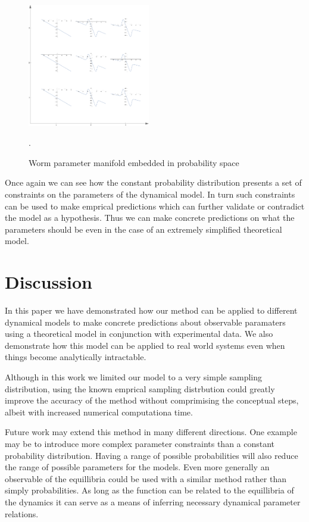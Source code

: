 \documentclass[letterpaper]{article}
\begin{document}
\begin{figure}[t]
\begin{center}
\includegraphics[width=2.1in,angle=0]{./worm_params.png}
\caption{Worm parameter manifold embedded in probability space}.
\label{worm_prob}
\end{center}
\end{figure}

Once again we can see how the constant probability distribution presents a set of 
constraints on the parameters of the dynamical model. In turn such constraints can
be used to make emprical predictions which can further validate or contradict the
model as a hypothesis. Thus we can make concrete predictions on what the parameters
should be even in the case of an extremely simplified theoretical model.

\section{Discussion}
In this paper we have demonstrated how our method can be applied to different
dynamical models to make concrete predictions about observable paramaters using 
a theoretical model in conjunction with experimental data. We also demonstrate
how this model can be applied to real world systems even when things become 
analytically intractable.

Although in this work we limited our model to a very simple sampling distribution,
using the known emprical sampling distrbution could greatly improve the accuracy of
the method without comprimising the conceptual steps, albeit with increased numerical
computationa time.

Future work may extend this method in many different directions. One example may 
be to introduce more complex parameter constraints than a constant probability
distribution. Having a range of possible probabilities will also reduce the
range of possible parameters for the models. Even more generally an observable
of the equillibria could be used with a similar method rather than simply
probabilities. As long as the function can be related to the equillibria of the
dynamics it can serve as a means of inferring necessary dynamical parameter relations.
\end{document}
